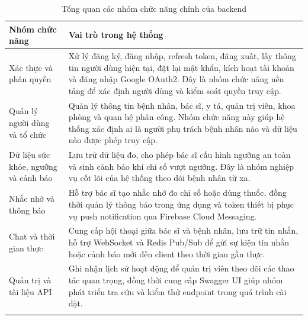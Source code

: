 \begin{center}
\renewcommand{\arraystretch}{1.25}
\begin{longtable}{|L{4.2cm}|L{10.2cm}|}
    \hline
    \textbf{Nhóm chức năng} & \textbf{Vai trò trong hệ thống} \\
    \hline
    \endfirsthead
    


    Xác thực và phân quyền &
    Xử lý đăng ký, đăng nhập, refresh token, đăng xuất, lấy thông tin người dùng hiện tại, đặt lại mật khẩu, kích hoạt tài khoản và đăng nhập Google OAuth2. Đây là nhóm chức năng nền tảng để xác định người dùng và kiểm soát quyền truy cập. \\
    \hline

    Quản lý người dùng và tổ chức &
    Quản lý thông tin bệnh nhân, bác sĩ, y tá, quản trị viên, khoa phòng và quan hệ phân công. Nhóm chức năng này giúp hệ thống xác định ai là người phụ trách bệnh nhân nào và dữ liệu nào được phép truy cập. \\
    \hline

    Dữ liệu sức khỏe, ngưỡng và cảnh báo &
    Lưu trữ dữ liệu đo, cho phép bác sĩ cấu hình ngưỡng an toàn và sinh cảnh báo khi chỉ số vượt ngưỡng. Đây là nhóm nghiệp vụ cốt lõi của hệ thống theo dõi bệnh nhân từ xa. \\
    \hline

    Nhắc nhở và thông báo &
    Hỗ trợ bác sĩ tạo nhắc nhở đo chỉ số hoặc dùng thuốc, đồng thời quản lý thông báo trong ứng dụng và token thiết bị phục vụ push notification qua Firebase Cloud Messaging. \\
    \hline

    Chat và thời gian thực &
    Cung cấp hội thoại giữa bác sĩ và bệnh nhân, lưu trữ tin nhắn, hỗ trợ WebSocket và Redis Pub/Sub để gửi sự kiện tin nhắn hoặc cảnh báo mới đến client theo thời gian gần thực. \\
    \hline

    Quản trị và tài liệu API &
    Ghi nhận lịch sử hoạt động để quản trị viên theo dõi các thao tác quan trọng, đồng thời cung cấp Swagger UI giúp nhóm phát triển tra cứu và kiểm thử endpoint trong quá trình cài đặt. \\
    \hline

    \caption{Tổng quan các nhóm chức năng chính của backend}
    \label{chapter3-table-backend-function-groups}
\end{longtable}
\end{center}

